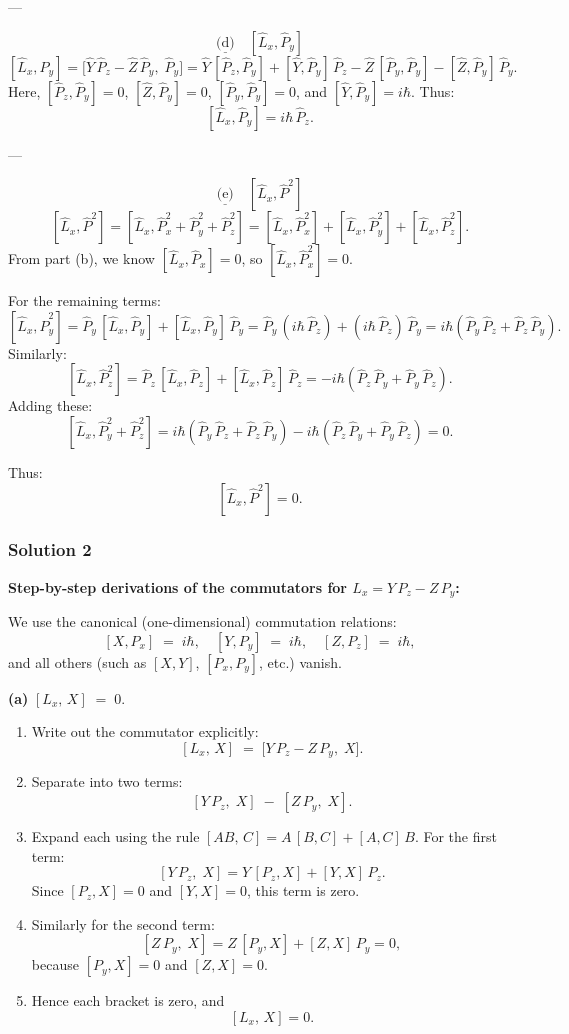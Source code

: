 \documentclass{article}
\begin{document}
---

\[
\underline{\text{(d)}} \quad [\hat{L}_x, \hat{P}_y]
\]
\[
[\hat{L}_x, \hat{P}_y] = \Big[\hat{Y}\,\hat{P}_z - \hat{Z}\,\hat{P}_y,\;\hat{P}_y\Big]
= \hat{Y}\,[\hat{P}_z,\hat{P}_y] + [\hat{Y},\hat{P}_y]\,\hat{P}_z - \hat{Z}\,[\hat{P}_y,\hat{P}_y] - [\hat{Z},\hat{P}_y]\,\hat{P}_y.
\]
Here, \( [\hat{P}_z,\hat{P}_y] = 0 \), \( [\hat{Z},\hat{P}_y] = 0 \), \( [\hat{P}_y,\hat{P}_y] = 0 \), and \( [\hat{Y},\hat{P}_y] = i\hbar \). Thus:
\[
[\hat{L}_x, \hat{P}_y] = i\hbar\,\hat{P}_z.
\]

---

\[
\underline{\text{(e)}} \quad [\hat{L}_x, \hat{P}^2]
\]
\[
[\hat{L}_x, \hat{P}^2] = [\hat{L}_x, \hat{P}_x^2 + \hat{P}_y^2 + \hat{P}_z^2]
= [\hat{L}_x, \hat{P}_x^2] + [\hat{L}_x, \hat{P}_y^2] + [\hat{L}_x, \hat{P}_z^2].
\]
From part (b), we know \( [\hat{L}_x, \hat{P}_x] = 0 \), so \( [\hat{L}_x, \hat{P}_x^2] = 0 \).

For the remaining terms:
\[
[\hat{L}_x, \hat{P}_y^2] = \hat{P}_y\,[\hat{L}_x,\hat{P}_y] + [\hat{L}_x,\hat{P}_y]\,\hat{P}_y 
= \hat{P}_y\,(i\hbar\,\hat{P}_z) + (i\hbar\,\hat{P}_z)\,\hat{P}_y = i\hbar(\hat{P}_y\,\hat{P}_z + \hat{P}_z\,\hat{P}_y).
\]
Similarly:
\[
[\hat{L}_x, \hat{P}_z^2] = \hat{P}_z\,[\hat{L}_x,\hat{P}_z] + [\hat{L}_x,\hat{P}_z]\,\hat{P}_z 
= -i\hbar(\hat{P}_z\,\hat{P}_y + \hat{P}_y\,\hat{P}_z).
\]
Adding these:
\[
[\hat{L}_x, \hat{P}_y^2 + \hat{P}_z^2] = i\hbar(\hat{P}_y\,\hat{P}_z + \hat{P}_z\,\hat{P}_y) - i\hbar(\hat{P}_z\,\hat{P}_y + \hat{P}_y\,\hat{P}_z) = 0.
\]

Thus:
\[
[\hat{L}_x, \hat{P}^2] = 0.
\]

\subsubsection{Solution 2}

\textbf{Step-by-step derivations of the commutators for $L_x = Y\,P_z - Z\,P_y$:}

We use the canonical (one-dimensional) commutation relations:
\[
[X,P_x] \;=\; i\hbar,\quad
[Y,P_y] \;=\; i\hbar,\quad
[Z,P_z] \;=\; i\hbar,
\]
and all others (such as $[X,Y]$, $[P_x,P_y]$, etc.) vanish.

\bigskip
\noindent
\textbf{(a)} \; $\displaystyle [L_x,\,X] \;=\; 0.$

\begin{enumerate}
\item Write out the commutator explicitly:
\[
[L_x,\,X] 
\;=\;
\bigl[Y\,P_z - Z\,P_y,\;X\bigr].
\]
\item Separate into two terms:
\[
[Y\,P_z,\;X] \;-\; [Z\,P_y,\;X].
\]
\item Expand each using the rule $[AB,\,C] = A\,[B,C]+[A,C]\,B$. For the first term:
\[
[Y\,P_z,\;X] = Y\,[P_z,X] + [Y,X]\,P_z.
\]
Since $[P_z,X] = 0$ and $[Y,X]=0$, this term is zero.  
\item Similarly for the second term:
\[
[Z\,P_y,\;X] = Z\,[P_y,X] + [Z,X]\,P_y = 0,
\]
because $[P_y,X]=0$ and $[Z,X]=0$. 
\item Hence each bracket is zero, and 
\[
[L_x,\,X] = 0.
\]
\end{enumerate}
\end{document}

